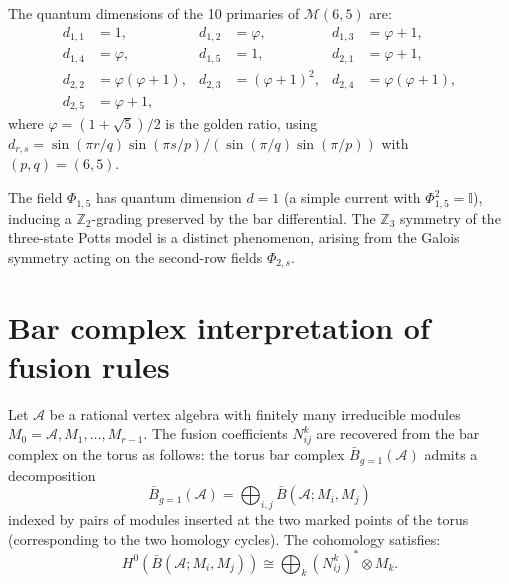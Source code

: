 \begin{proposition}
\label{prop:potts-quantum-dim}
The quantum dimensions of the 10 primaries of $\mathcal{M}(6,5)$ are:
\begin{align*}
d_{1,1} &= 1, &
d_{1,2} &= \varphi, &
d_{1,3} &= \varphi + 1, \\
d_{1,4} &= \varphi, &
d_{1,5} &= 1, &
d_{2,1} &= \varphi + 1, \\
d_{2,2} &= \varphi(\varphi+1), &
d_{2,3} &= (\varphi+1)^2, &
d_{2,4} &= \varphi(\varphi+1), \\
d_{2,5} &= \varphi + 1,
\end{align*}
where $\varphi = (1+\sqrt{5})/2$ is the golden ratio, using
$d_{r,s} = \sin(\pi r/q)\sin(\pi s/p)/(\sin(\pi/q)\sin(\pi/p))$
with $(p,q)=(6,5)$.
\end{proposition}

\begin{remark}
\label{rem:z3-simple-current}
The field $\Phi_{1,5}$ has quantum dimension $d = 1$ (a simple current with $\Phi_{1,5}^2 = \mathbb{I}$), inducing a $\mathbb{Z}_2$-grading preserved by the bar differential. The $\mathbb{Z}_3$ symmetry of the three-state Potts model is a distinct phenomenon, arising from the Galois symmetry acting on the second-row fields $\Phi_{2,s}$.
\end{remark}


\section{Bar complex interpretation of fusion rules}
\label{sec:bar-fusion-interpretation}

\begin{theorem}
\label{thm:fusion-bar-torus}
Let $\mathcal{A}$ be a rational vertex algebra with finitely many
irreducible modules $M_0 = \mathcal{A}, M_1, \ldots, M_{r-1}$.
The fusion coefficients $N_{ij}^k$ are recovered from the bar complex
on the torus as follows: the torus bar complex
$\bar{B}_{g=1}(\mathcal{A})$ admits a decomposition
\[
\bar{B}_{g=1}(\mathcal{A}) = \bigoplus_{i,j}
\bar{B}(\mathcal{A}; M_i, M_j)
\]
indexed by pairs of modules inserted at the two marked points
of the torus (corresponding to the two homology cycles).
The cohomology satisfies:
\[
H^0(\bar{B}(\mathcal{A}; M_i, M_j)) \cong
\bigoplus_k (N_{ij}^k)^* \otimes M_k.
\]
\end{theorem}

